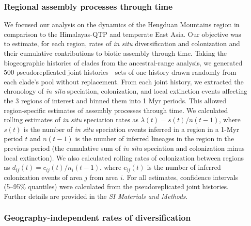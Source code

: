 \subsubsection{Regional assembly processes through time}

We focused our analysis on the dynamics of the Hengduan Mountains region in comparison to the Himalayas-QTP and temperate East Asia. Our objective was to estimate, for each region, rates of \textit{in situ} diversification and colonization and their cumulative contributions to biotic assembly through time. Taking the biogeographic histories of clades from the ancestral-range analysis, we generated 500 pseudoreplicated joint histories---sets of one history drawn randomly from each clade's pool without replacement. From each joint history, we extracted the chronology of \textit{in situ} speciation, colonization, and local extinction events affecting the 3 regions of interest and binned them into 1 Myr periods. This allowed region-specific estimates of assembly processes through time. We calculated rolling estimates of \textit{in situ} speciation rates as $\lambda(t) = s(t)/n(t-1)$, where $s(t)$ is the number of \textit{in situ} speciation events inferred in a region in a 1-Myr period $t$ and $n(t-1)$ is the number of inferred lineages in the region in the previous period (the cumulative sum of \textit{in situ} speciation and colonization minus local extinction). We also calculated rolling rates of colonization between regions as $d_{ij}(t) = c_{ij}(t)/n_i(t-1)$, where $c_{ij}(t)$ is the number of inferred colonization events of area $j$ from area $i$. For all estimates, confidence intervals (5--95\% quantiles) were calculated from the pseudoreplicated joint histories. Further details are provided in the \textit{SI Materials and Methods}.

\subsubsection{Geography-independent rates of diversification}


